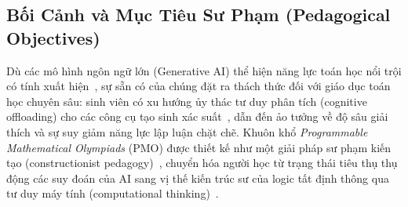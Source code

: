 \documentclass{article}
\begin{document}
\subsection{Bối Cảnh và Mục Tiêu Sư Phạm (Pedagogical Objectives)}
Dù các mô hình ngôn ngữ lớn (Generative AI) thể hiện năng lực toán học nổi trội có tính xuất hiện~\cite{bubeck2023sparks, floridi2020gpt3}, sự sẵn có của chúng đặt ra thách thức đối với giáo dục toán học chuyên sâu: sinh viên có xu hướng ủy thác tư duy phân tích (cognitive offloading) cho các công cụ tạo sinh xác suất~\cite{rozenblit2002illusion}, dẫn đến ảo tưởng về độ sâu giải thích và sự suy giảm năng lực lập luận chặt chẽ. Khuôn khổ \textit{Programmable Mathematical Olympiads} (PMO) được thiết kế như một giải pháp sư phạm kiến tạo (constructionist pedagogy)~\cite{papert1980mindstorms}, chuyển hóa người học từ trạng thái tiêu thụ thụ động các suy đoán của AI sang vị thế kiến trúc sư của logic tất định thông qua tư duy máy tính (computational thinking)~\cite{wing2006computational, sriraman2004characteristics}.
\end{document}

